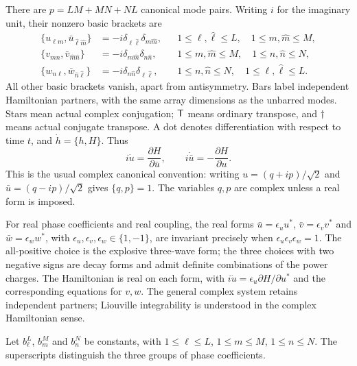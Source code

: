 There are $p=LM+MN+NL$ canonical mode pairs. Writing $i$ for the
imaginary unit, their nonzero basic brackets are
\begin{equation}\label{eq:canonical-brackets}
\begin{aligned}
 \{u_{\ell m},\bar{u}_{\hat\ell\hat m}\}&=-i\delta_{\ell\hat\ell}\delta_{m\hat m},
 &&1\leq\ell,\hat\ell\leq L,\quad1\leq m,\hat m\leq M,\\
 \{v_{mn},\bar{v}_{\hat m\hat n}\}&=-i\delta_{m\hat m}\delta_{n\hat n},
 &&1\leq m,\hat m\leq M,\quad1\leq n,\hat n\leq N,\\
 \{w_{n\ell},\bar{w}_{\hat n\hat\ell}\}&=-i\delta_{n\hat n}\delta_{\ell\hat\ell},
 &&1\leq n,\hat n\leq N,\quad1\leq\ell,\hat\ell\leq L.
\end{aligned}
\end{equation}
All other basic brackets vanish, apart from antisymmetry. Bars label
independent Hamiltonian partners, with the same array dimensions as the
unbarred modes. Stars mean actual complex conjugation; $\mathsf T$ means
ordinary transpose, and $\dagger$ means actual conjugate transpose.
A dot denotes differentiation with respect to time $t$, and
$\dot h=\{h,H\}$. Thus
\[
 i\dot u=\frac{\partial H}{\partial\bar u},\qquad
 i\dot{\bar u}=-\frac{\partial H}{\partial u}.
\]
This is the usual complex canonical convention: writing
$u=(q+ip)/\sqrt2$ and $\bar u=(q-ip)/\sqrt2$ gives $\{q,p\}=1$.
The variables $q,p$ are complex unless a real form is imposed.

For real phase coefficients and real coupling, the real forms
$\bar u=\epsilon_u u^*$, $\bar v=\epsilon_v v^*$ and
$\bar w=\epsilon_w w^*$, with $\epsilon_u,\epsilon_v,\epsilon_w\in\{1,-1\}$,
are invariant precisely when $\epsilon_u\epsilon_v\epsilon_w=1$.
The all-positive choice is the explosive three-wave form; the three
choices with two negative signs are decay forms and admit definite
combinations of the power charges. The Hamiltonian is real on each
form, with $i\dot u=\epsilon_u\partial H/\partial u^*$ and the
corresponding equations for $v,w$. The general complex system retains
independent partners; Liouville integrability is understood in the
complex Hamiltonian sense.

Let $b_\ell^{L}$, $b_m^{M}$ and $b_n^{N}$ be constants, with
$1\leq\ell\leq L$, $1\leq m\leq M$, $1\leq n\leq N$.
The superscripts distinguish the three groups of phase coefficients.

